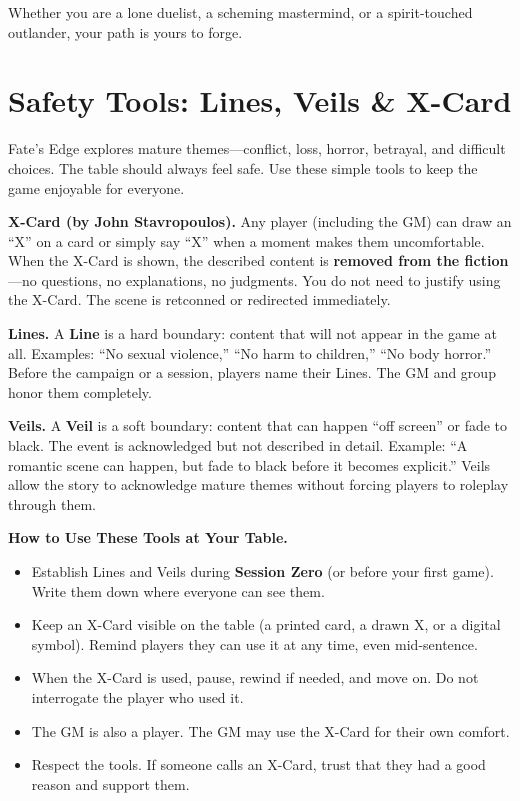 Whether you are a lone duelist, a scheming mastermind, or a spirit-touched outlander, your path is yours to forge.

\section*{Safety Tools: Lines, Veils \& X-Card}
\label{sec:safety}

\begin{tcolorbox}[colback=red!5!white, colframe=red!75!black, title=\textbf{Safety Tools: Lines, Veils \& X-Card}, fonttitle=\bfseries\large,breakable]
Fate's Edge explores mature themes---conflict, loss, horror, betrayal, and difficult choices. The table should always feel safe. Use these simple tools to keep the game enjoyable for everyone.

\medskip
\noindent\textbf{X-Card (by John Stavropoulos).} Any player (including the GM) can draw an ``X'' on a card or simply say ``X'' when a moment makes them uncomfortable. When the X-Card is shown, the described content is \textbf{removed from the fiction}---no questions, no explanations, no judgments. You do not need to justify using the X-Card. The scene is retconned or redirected immediately.

\medskip
\noindent\textbf{Lines.} A \textbf{Line} is a hard boundary: content that will not appear in the game at all. Examples: ``No sexual violence,'' ``No harm to children,'' ``No body horror.'' Before the campaign or a session, players name their Lines. The GM and group honor them completely.

\medskip
\noindent\textbf{Veils.} A \textbf{Veil} is a soft boundary: content that can happen ``off screen'' or fade to black. The event is acknowledged but not described in detail. Example: ``A romantic scene can happen, but fade to black before it becomes explicit.'' Veils allow the story to acknowledge mature themes without forcing players to roleplay through them.

\medskip
\noindent\textbf{How to Use These Tools at Your Table.}
\begin{itemize}
\item Establish Lines and Veils during \textbf{Session Zero} (or before your first game). Write them down where everyone can see them.
\item Keep an X-Card visible on the table (a printed card, a drawn X, or a digital symbol). Remind players they can use it at any time, even mid-sentence.
\item When the X-Card is used, pause, rewind if needed, and move on. Do not interrogate the player who used it.
\item The GM is also a player. The GM may use the X-Card for their own comfort.
\item Respect the tools. If someone calls an X-Card, trust that they had a good reason and support them.
\end{itemize}


\end{tcolorbox}
